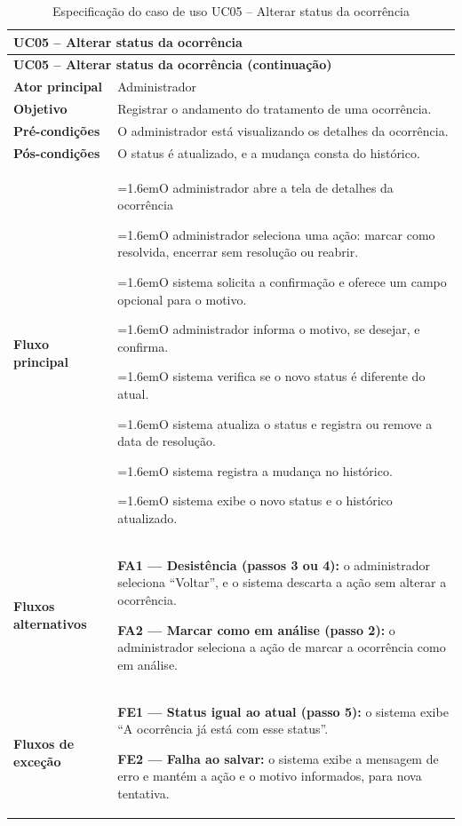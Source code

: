 \documentclass[12pt,a4paper]{article}
\newcommand{\ucitem}[2]{\par\noindent\hangindent=1.6em\hangafter=1\makebox[1.6em][l]{#1}#2}
\begin{document}
\begin{longtable}{|p{}|p{}|}
\caption{Especificação do caso de uso UC05 -- Alterar status da ocorrência}
\label{tab:uc05} \\
\hline
\multicolumn{2}{|l|}{\textbf{UC05 -- Alterar status da ocorrência}} \\
\hline
\endfirsthead

\hline
\multicolumn{2}{|l|}{\textbf{UC05 -- Alterar status da ocorrência (continuação)}} \\
\hline
\endhead

\hline
\endfoot
\textbf{Ator principal} & Administrador \\ \hline
\textbf{Objetivo} & Registrar o andamento do tratamento de uma ocorrência. \\ \hline
\textbf{Pré-condições} & O administrador está visualizando os detalhes da ocorrência. \\ \hline
\textbf{Pós-condições} & O status é atualizado, e a mudança consta do histórico. \\ \hline 
\textbf{Fluxo principal} &
\ucitem{1.}{O administrador abre a tela de detalhes da ocorrência}
\ucitem{2.}{O administrador seleciona uma ação: marcar como resolvida, encerrar sem resolução ou reabrir.}
\ucitem{3.}{O sistema solicita a confirmação e oferece um campo opcional para o motivo.}
\ucitem{4.}{O administrador informa o motivo, se desejar, e confirma.}
\ucitem{5.}{O sistema verifica se o novo status é diferente do atual.}
\ucitem{6.}{O sistema atualiza o status e registra ou remove a data de resolução.}
\ucitem{7.}{O sistema registra a mudança no histórico.}
\ucitem{8.}{O sistema exibe o novo status e o histórico atualizado.} \\ \hline
\textbf{Fluxos alternativos} &
\noindent \textbf{FA1 — Desistência (passos 3 ou 4):} o administrador seleciona ``Voltar'', e o sistema descarta a ação sem alterar a ocorrência.
\par\smallskip\noindent \textbf{FA2 — Marcar como em análise (passo 2):} o administrador seleciona a ação de marcar a ocorrência como em análise.
\\ \hline
\textbf{Fluxos de exceção} &
\noindent \textbf{FE1 — Status igual ao atual (passo 5):} o sistema exibe ``A ocorrência já está com esse status''.
\par\smallskip\noindent \textbf{FE2 — Falha ao salvar:} o sistema exibe a mensagem de erro e mantém a ação e o motivo informados, para nova tentativa. \\
\end{longtable}
\end{document}
